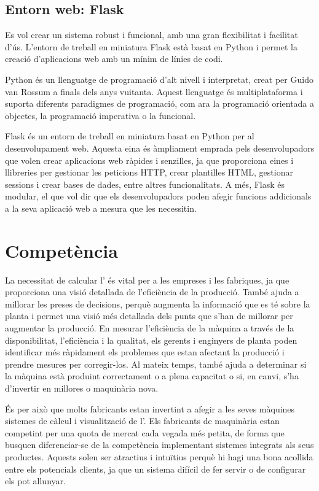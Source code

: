 \documentclass{tfgitic}[2022/06/30]
\begin{document}
\subsection{Entorn web: Flask}
Es vol crear un sistema robust i funcional, amb una gran flexibilitat i facilitat d'ús. L'entorn de treball en miniatura Flask està basat en Python i permet la creació d'aplicacions web amb un mínim de línies de codi.

Python és un llenguatge de programació d'alt nivell i interpretat, creat per Guido van Rossum a finals dels anys vuitanta. Aquest llenguatge és multiplataforma i suporta diferents paradigmes de programació, com ara la programació orientada a objectes, la programació imperativa o la funcional.

Flask és un entorn de treball en miniatura basat en Python per al desenvolupament web. Aquesta eina és àmpliament emprada pels desenvolupadors que volen crear aplicacions web ràpides i senzilles, ja que proporciona eines i llibreries per gestionar les peticions HTTP, crear plantilles HTML, gestionar sessions i crear bases de dades, entre altres funcionalitats. A més, Flask és modular, el que vol dir que els desenvolupadors poden afegir funcions addicionals a la seva aplicació web a mesura que les necessitin.


\section{Competència}
La necessitat de calcular l' és vital per a les empreses i les fabriques, ja que proporciona una visió detallada de l'eficiència de la producció. També ajuda a millorar les preses de decisions, perquè augmenta la informació que es té sobre la planta i permet una visió més detallada dels punts que s'han de millorar per augmentar la producció. En mesurar l'eficiència de la màquina a través de la disponibilitat, l'eficiència i la qualitat, els gerents i enginyers de planta poden identificar més ràpidament els problemes que estan afectant la producció i prendre mesures per corregir-los. Al mateix temps, també ajuda a determinar si la màquina està produint correctament o a plena capacitat o si, en canvi, s'ha d'invertir en millores o maquinària nova.

És per això que molts fabricants estan invertint a afegir a les seves màquines sistemes de càlcul i visualització de l'. Els fabricants de maquinària estan competint per una quota de mercat cada vegada més petita, de forma que busquen diferenciar-se de la competència implementant sistemes integrats als seus productes. Aquests solen ser atractius i intuïtius perquè hi hagi una bona acollida entre els potencials clients, ja que un sistema difícil de fer servir o de configurar els pot allunyar.
\end{document}

